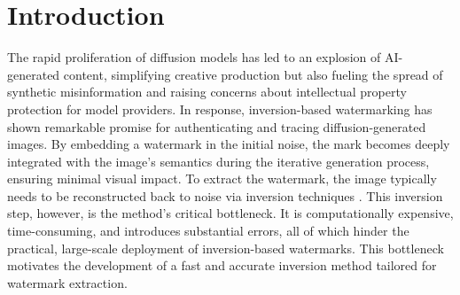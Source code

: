\documentclass{article}
\begin{document}
\begin{abstract}
\end{abstract}

\section{Introduction}
\label{sec:intro}

The rapid proliferation of diffusion models \citep{ddpm_2020, ddim_2021} has led to an explosion of AI-generated content, simplifying creative production but also fueling the spread of synthetic misinformation and raising concerns about intellectual property protection for model providers.
In response, inversion-based watermarking \citep{gs_2024, treering_2023, robin2024, prcw_2025} has shown remarkable promise for authenticating and tracing diffusion-generated images. By embedding a watermark in the initial noise, the mark becomes deeply integrated with the image's semantics during the iterative generation process, ensuring minimal visual impact. To extract the watermark, the image typically needs to be reconstructed back to noise via inversion techniques \citep{ddim_2021, exactdpm2024}. This inversion step, however, is the method's critical bottleneck. It is computationally expensive, time-consuming, and introduces substantial errors, all of which hinder the practical, large-scale deployment of inversion-based watermarks. This bottleneck motivates the development of a fast and accurate inversion method tailored for watermark extraction.
\end{document}
